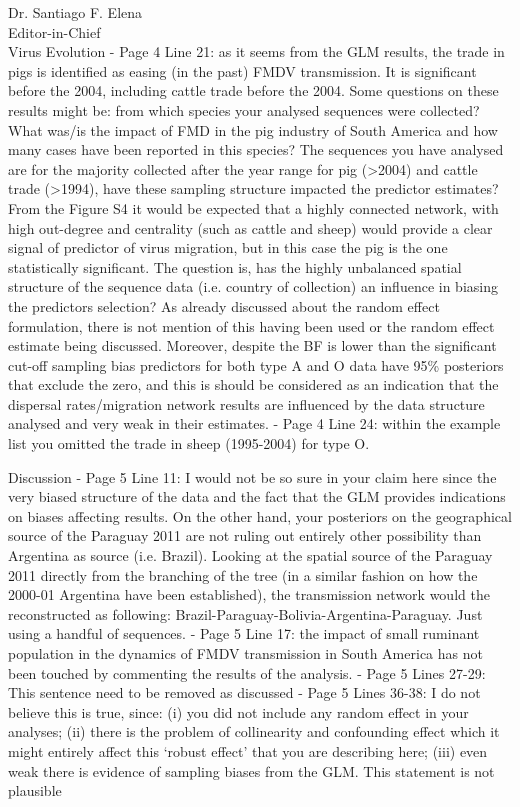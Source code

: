 \documentclass[12pt, a4paper]{letter} %
\begin{document}
\begin{letter}{
	Dr. Santiago F. Elena\\
    Editor-in-Chief \\
    Virus Evolution
}
-       Page 4 Line 21: as it seems from the GLM results, the trade in pigs is identified as easing (in the past) FMDV transmission.
It is significant before the 2004, including cattle trade before the 2004.
Some questions on these results might be: from which species your analysed sequences were collected?
What was/is the impact of FMD in the pig industry of South America and how many cases have been reported in this species?
The sequences you have analysed are for the majority collected after the year range for pig (>2004) and cattle trade (>1994), have these sampling structure impacted the predictor estimates?
From the Figure S4 it would be expected that a highly connected network, with high out-degree and centrality (such as cattle and sheep) would provide a clear signal of predictor of virus migration, but in this case the pig is the one statistically significant.
The question is, has the highly unbalanced spatial structure of the sequence data (i.e. country of collection) an influence in biasing the predictors selection?
As already discussed about the random effect formulation, there is not mention of this having been used or the random effect estimate being discussed.
Moreover, despite the BF is lower than the significant cut-off sampling bias predictors for both type A and O data have 95\% posteriors that exclude the zero, and this is should be considered as an indication that the dispersal rates/migration network results are influenced by the data structure analysed and very weak in their estimates.
-       Page 4 Line 24: within the example list you omitted the trade in sheep (1995-2004) for type O.

Discussion
-       Page 5 Line 11: I would not be so sure in your claim here since the very biased structure of the data and the fact that the GLM provides indications on biases affecting results.
On the other hand, your posteriors on the geographical source of the Paraguay 2011 are not ruling out entirely other possibility than Argentina as source (i.e. Brazil).
Looking at the spatial source of the Paraguay 2011 directly from the branching of the tree (in a similar fashion on how the 2000-01 Argentina have been established), the transmission network would the reconstructed as following: Brazil-Paraguay-Bolivia-Argentina-Paraguay.
Just using a handful of sequences.
-       Page 5 Line 17: the impact of small ruminant population in the dynamics of FMDV transmission in South America has not been touched by commenting the results of the analysis.
-       Page 5 Lines 27-29: This sentence need to be removed as discussed
-       Page 5 Lines 36-38: I do not believe this is true, since: (i) you did not include any random effect in your analyses; (ii) there is the problem of collinearity and confounding effect which it might entirely affect this ‘robust effect’ that you are describing here; (iii) even weak there is evidence of sampling biases from the GLM. This statement is not plausible


\end{letter}
\end{document}
